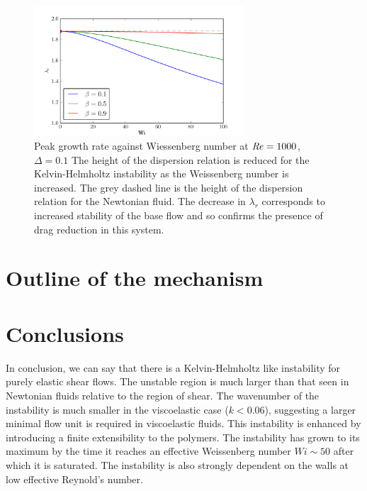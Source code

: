 \documentclass{jfm}
\newcommand\Rey{\mbox{\textit{Re}}}  %
\begin{document}
\begin{figure}
    \centering
    \includegraphics[width=0.7\textwidth]{KH_high_Re_vary_Wi}
    \caption{Peak growth rate against Wiessenberg number at $\Rey = 1000$, $\Delta = 0.1$ The height of the dispersion relation is reduced for the Kelvin-Helmholtz instability as the Weissenberg number is increased. The grey dashed line is the height of the dispersion relation for the Newtonian fluid. The decrease in $\lambda_{r}$ corresponds to increased stability of the base flow and so confirms the presence of drag reduction in this system.}
    \label{fig:KH_drag_reduction}
\end{figure}

\section{Outline of the mechanism}

\section{Conclusions}

In conclusion, we can say that there is a Kelvin-Helmholtz like instability for purely elastic shear flows. The unstable region is much larger than that seen in Newtonian fluids relative to the region of shear. The wavenumber of the instability is much smaller in the viscoelastic case ($k<0.06$), suggesting a larger minimal flow unit is required in viscoelastic fluids. This instability is enhanced by introducing a finite extensibility to the polymers. The instability has grown to its maximum by the time it reaches an effective Weissenberg number $ Wi \sim 50$ after which it is saturated. The instability is also strongly dependent on the walls at low effective Reynold's number.





\end{document}
